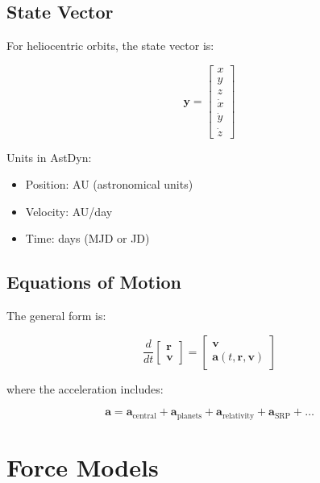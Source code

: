\subsection{State Vector}

For heliocentric orbits, the state vector is:

\begin{equation}
    \mathbf{y} = \begin{bmatrix} x \\ y \\ z \\ \dot{x} \\ \dot{y} \\ \dot{z} \end{bmatrix}
\end{equation}

Units in AstDyn:
\begin{itemize}
    \item Position: AU (astronomical units)
    \item Velocity: AU/day
    \item Time: days (MJD or JD)
\end{itemize}

\subsection{Equations of Motion}

The general form is:

\begin{equation}
    \frac{d}{dt}\begin{bmatrix} \mathbf{r} \\ \mathbf{v} \end{bmatrix} = \begin{bmatrix} \mathbf{v} \\ \mathbf{a}(t, \mathbf{r}, \mathbf{v}) \end{bmatrix}
\end{equation}

where the acceleration includes:

\begin{equation}
    \mathbf{a} = \mathbf{a}_{\text{central}} + \mathbf{a}_{\text{planets}} + \mathbf{a}_{\text{relativity}} + \mathbf{a}_{\text{SRP}} + \ldots
\end{equation}

\section{Force Models}

